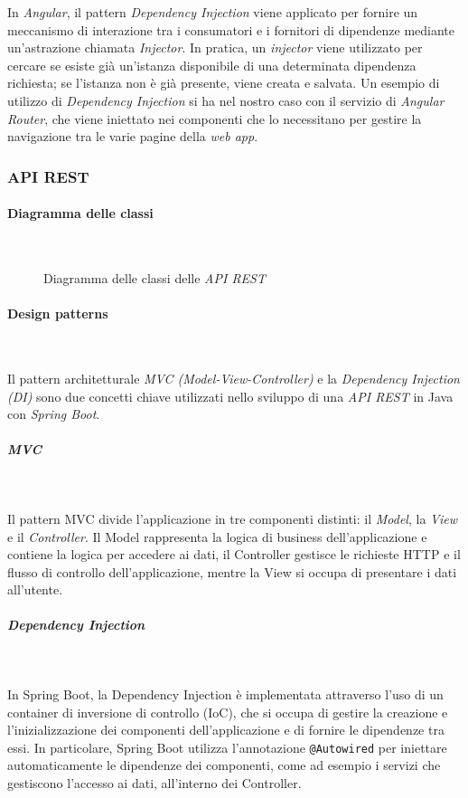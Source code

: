 \noindent In \textit{Angular}, il pattern \textit{Dependency Injection} viene applicato per fornire un meccanismo di interazione tra i consumatori e i fornitori di dipendenze mediante un'astrazione chiamata \textit{Injector}. In pratica, un \textit{injector} viene utilizzato per cercare se esiste già un'istanza disponibile di una determinata dipendenza richiesta; se l'istanza non è già presente, viene creata e salvata. Un esempio di utilizzo di \textit{Dependency Injection} si ha nel nostro caso con il servizio di \textit{Angular} \textit{Router}, che viene iniettato nei componenti che lo necessitano per gestire la navigazione tra le varie pagine della \textit{web app}.

\subsubsection{API REST}
\paragraph{Diagramma delle classi}~
\begin{figure}[H]
    
    \caption{Diagramma delle classi delle \textit{API REST}}\label{fig:apirest}
\end{figure}

\paragraph{Design patterns}~

\noindent Il pattern architetturale \textit{MVC (Model-View-Controller)} e la \textit{Dependency Injection (DI)} sono due concetti chiave utilizzati nello sviluppo di una \textit{API REST} in Java con \textit{Spring Boot}.

\subparagraph{MVC}~

\noindent Il pattern MVC divide l'applicazione in tre componenti distinti: il \textit{Model}, la \textit{View} e il \textit{Controller}. Il Model rappresenta la logica di business dell'applicazione e contiene la logica per accedere ai dati, il Controller gestisce le richieste HTTP e il flusso di controllo dell'applicazione, mentre la View si occupa di presentare i dati all'utente.

\subparagraph{Dependency Injection}~

\noindent In Spring Boot, la Dependency Injection è implementata attraverso l'uso di un container di inversione di controllo (IoC), che si occupa di gestire la creazione e l'inizializzazione dei componenti dell'applicazione e di fornire le dipendenze tra essi. In particolare, Spring Boot utilizza l'annotazione \texttt{@Autowired} per iniettare automaticamente le dipendenze dei componenti, come ad esempio i servizi che gestiscono l'accesso ai dati, all'interno dei Controller.

